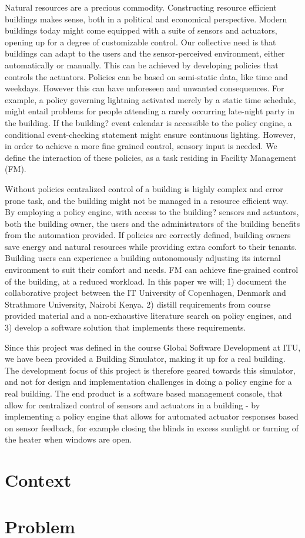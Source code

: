 Natural resources are a precious commodity. Constructing resource efficient buildings makes sense, both in a political and economical perspective. Modern buildings today might come equipped with a suite of sensors and actuators, opening up for a degree of customizable control. Our collective need is that buildings can adapt to the users and the sensor-perceived environment, either automatically or manually. This can be achieved by developing policies that controls the actuators. Policies can be based on semi-static data, like time and weekdays. However this can have unforeseen and unwanted consequences. For example, a policy governing lightning activated merely by a static time schedule, might entail problems for people attending a rarely occurring late-night party in the building. If the building? event calendar is accessible to the policy engine, a conditional event-checking statement might ensure continuous lighting. However, in order to achieve a more fine grained control, sensory input is needed. We define the interaction of these policies, as a task residing in Facility Management (FM). 

Without policies centralized control of a building is highly complex and error prone task, and the building might not be managed in a resource efficient way. By employing a policy engine, with access to the building? sensors and actuators, both the building owner, the users and the administrators of the building benefits from the automation provided. If policies are correctly defined, building owners save energy and natural resources while providing extra comfort to their tenants. Building users can experience a building autonomously adjusting its internal environment to suit their comfort and needs. FM can achieve fine-grained control of the building, at a reduced workload. 
\newpage
In this paper we will; 1) document the collaborative project between the IT University of Copenhagen, Denmark and Strathmore University, Nairobi Kenya. 2) distill requirements from course provided material and a non-exhaustive literature search on policy engines, and 3) develop a software solution that implements these requirements.

Since this project was defined in the course Global Software Development at ITU, we have been provided a Building Simulator, making it up for a real building. The development focus of this project is therefore geared towards this simulator, and not for design and implementation challenges in doing a policy engine for a real building. The end product is a software based management console, that allow for centralized control of sensors and actuators in a building - by implementing a policy engine that allows for automated actuator responses based on sensor feedback, for example closing the blinds in excess sunlight or turning of the heater when windows are open.
\section{Context}

\section{Problem}
